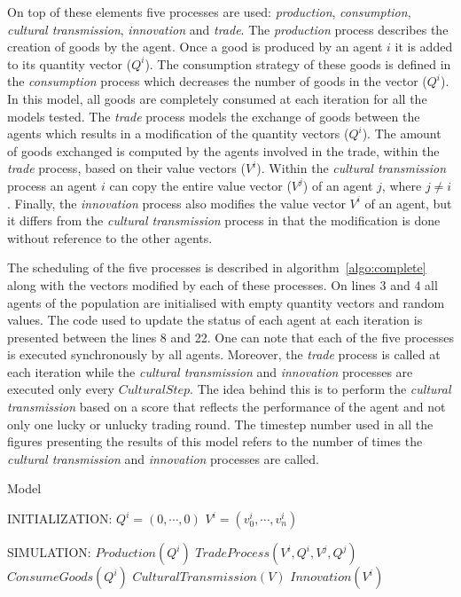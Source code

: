 \documentclass[a4paper]{article}
\begin{document}
On top of these elements five processes are used: \emph{production}, \emph{consumption}, \emph{cultural transmission}, \emph{innovation} and \emph{trade}. The \emph{production} process describes the creation of goods by the agent. Once a good is produced by an agent $i$ it is added to its quantity vector ($Q^i$). The consumption strategy of these goods is defined in the \emph{consumption} process which decreases the number of goods in the vector ($Q^i$). In this model, all goods are completely consumed at each iteration for all the models tested. The \emph{trade} process models the exchange of goods between the agents which results in a modification of the quantity vectors ($Q^i$). The amount of goods exchanged is computed by the agents involved in the trade, within the \emph{trade} process, based on their value vectors ($V^i$). Within the \emph{cultural transmission} process an agent $i$ can copy the entire value vector ($V^j$) of an agent $j$, where $j \neq i$. Finally, the \textit{innovation} process also modifies the value vector $V^i$ of an agent, but it differs from the \emph{cultural transmission} process in that the modification is done without reference to the other agents.

The scheduling of the five processes is described in algorithm~\ref{algo:complete} along with the vectors modified by each of these processes. On lines 3 and 4 all agents of the population are initialised with empty quantity vectors and random values. The code used to update the status of each agent at each iteration is presented between the lines 8 and 22. One can note that each of the five processes is executed synchronously by all agents. Moreover, the \emph{trade} process is called at each iteration while the \emph{cultural transmission} and \emph{innovation} processes are executed only every $CulturalStep$. The idea behind this is to perform the \emph{cultural transmission} based on a score that reflects the performance of the agent and not only one lucky or unlucky trading round. The timestep number used in all the figures presenting the results of this model refers to the number of times the \emph{cultural transmission} and \emph{innovation} processes are called.

\begin{algorithm}
\caption{Model}
\label{algo:complete}
	\begin{algorithmic}[1]
	\State INITIALIZATION: 
		 
				\State $Q^i = (0, \cdots, 0)$
				\State $V^i = (v^i_0, \cdots, v^i_n)$ 
		\EndFor

	\State SIMULATION:
				\State $Production(Q^i)$
			\EndFor
					\State $TradeProcess(V^i,Q^i,V^j,Q^j)$
				\EndFor		
			\EndFor
				\State $ConsumeGoods(Q^i)$ 
					\State $CulturalTransmission(V)$
					\State $Innovation(V^i)$
				\EndIf
			\EndFor
		\EndLoop
\end{algorithmic}
\end{algorithm}
\end{document}
